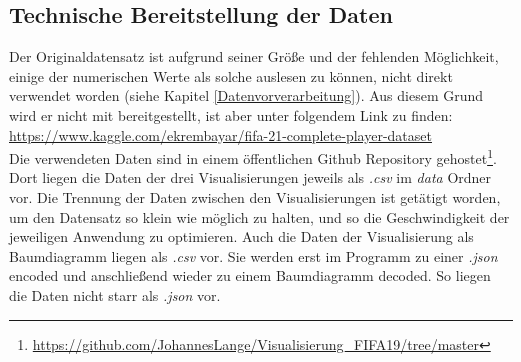 \documentclass[usegeometry=true]{scrartcl}
\begin{document}
\subsection{Technische Bereitstellung der Daten}
Der Originaldatensatz ist aufgrund seiner Größe und der fehlenden Möglichkeit, einige der numerischen Werte als solche auslesen zu können, nicht direkt verwendet worden (siehe Kapitel \ref{Datenvorverarbeitung}). Aus diesem Grund wird er nicht mit bereitgestellt, ist aber unter folgendem Link zu finden: \url{https://www.kaggle.com/ekrembayar/fifa-21-complete-player-dataset}\\
Die verwendeten Daten sind in einem öffentlichen Github Repository gehostet\footnote{\url{https://github.com/JohannesLange/Visualisierung_FIFA19/tree/master}}. Dort liegen die Daten der drei Visualisierungen jeweils als \textit{.csv} im \textit{data} Ordner vor. Die Trennung der Daten zwischen den Visualisierungen ist getätigt worden, um den Datensatz so klein wie möglich zu halten, und so die Geschwindigkeit der jeweiligen Anwendung zu optimieren.
Auch die Daten der Visualisierung als Baumdiagramm liegen als \textit{.csv} vor. Sie werden erst im Programm zu einer \textit{.json} encoded und anschließend wieder zu einem Baumdiagramm decoded. So liegen die Daten nicht starr als \textit{.json} vor. 
\end{document}
